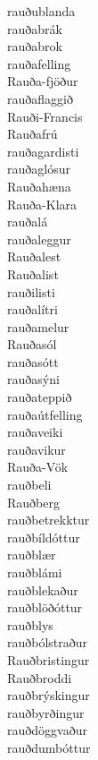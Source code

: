 \documentclass[../samsetningasafn.tex]{subfiles}
\begin{document}
\begin{bigwordlist}
\begin{footnotesize}
\begin{multicols}{4}
\begin{description}
		\item [rauðublanda]
		\item [rauðabrák]
		\item [rauðabrok]
		\item [rauðafelling]
		\item [Rauða-fjöður]
		\item [rauðaflaggið]
		\item [Rauði-Francis]
		\item [Rauðafrú]
		\item [rauðagardisti]
		\item [rauðaglósur]
		\item [Rauðahæna]
		\item [Rauða-Klara]
		\item [rauðalá]
		\item [rauðaleggur]
		\item [Rauðalest]
		\item [Rauðalist]	
		\item [rauðilisti]
		\item [rauðalítri]
		\item [rauðamelur]
		\item [Rauðasól]
		\item [rauðasótt]
		\item [rauðasýni]
		\item [rauðateppið]
		\item [rauðaútfelling]
		\item [rauðaveiki]
		\item [rauðavikur]
		\item [Rauða-Vök]
		\item [rauðbeli]
		\item [Rauðberg]
		\item [rauðbetrekktur]
		\item [rauðbíldóttur]
		\item [rauðblær]
		\item [rauðblámi]
		\item [rauðblekaður]
		\item [rauðblöðóttur]
		\item [rauðblys]
		\item [rauðbólstraður]
		\item [Rauðbristingur]
		\item [Rauðbroddi]
		\item [rauðbrýskingur]
		\item [rauðbyrðingur]
		\item [rauðdöggvaður]
		\item [rauðdumbóttur]

\end{description}
\end{multicols}
\end{footnotesize}
\end{bigwordlist}
\end{document}
